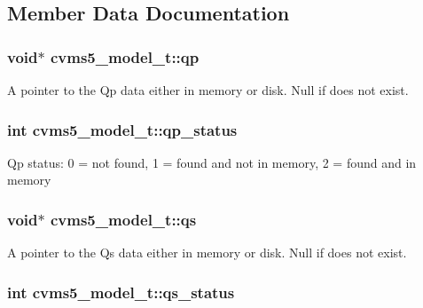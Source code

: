 \subsection{Member Data Documentation}
\hypertarget{structcvms5__model__t_aa3844d45e4d1ae2945748ba5942eac67}{
\subsubsection[{qp}]{\setlength{\rightskip}{0pt plus 5cm}void$\ast$ cvms5\+\_\+model\+\_\+t\+::qp}}\label{structcvms5__model__t_aa3844d45e4d1ae2945748ba5942eac67}
A pointer to the Qp data either in memory or disk. Null if does not exist. \hypertarget{structcvms5__model__t_afbd064c26423319fe50134a8033949d3}{
\subsubsection[{qp\+\_\+status}]{\setlength{\rightskip}{0pt plus 5cm}int cvms5\+\_\+model\+\_\+t\+::qp\+\_\+status}}\label{structcvms5__model__t_afbd064c26423319fe50134a8033949d3}
Qp status\+: 0 = not found, 1 = found and not in memory, 2 = found and in memory \hypertarget{structcvms5__model__t_a6df0c937c0e0f2889957303687e47cd0}{
\subsubsection[{qs}]{\setlength{\rightskip}{0pt plus 5cm}void$\ast$ cvms5\+\_\+model\+\_\+t\+::qs}}\label{structcvms5__model__t_a6df0c937c0e0f2889957303687e47cd0}
A pointer to the Qs data either in memory or disk. Null if does not exist. \hypertarget{structcvms5__model__t_a53665c8b1d9367a538cd635cc4007792}{
\subsubsection[{qs\+\_\+status}]{\setlength{\rightskip}{0pt plus 5cm}int cvms5\+\_\+model\+\_\+t\+::qs\+\_\+status}}\label{structcvms5__model__t_a53665c8b1d9367a538cd635cc4007792}
